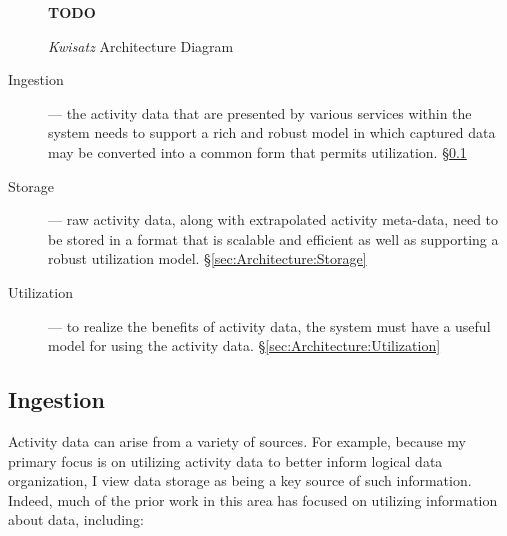 \documentclass[sigconf,anonymous,review]{acmart}
\newcommand{\system}[0]{\emph{Kwisatz}\xspace}
\begin{document}
\begin{figure}
    \caption{\system Architecture Diagram}\label{fig:architecture}
    \textbf{TODO}
\end{figure}

\begin{description}
    \item[Ingestion] --- the activity data that are presented by various
        services within the system needs to support a rich and robust model in which
        captured data may be converted into a common form that permits
        utilization. \S \ref{sec:Architecture:Ingestion}
    \item[Storage] --- raw activity data, along with extrapolated activity
        meta-data, need to be stored in a format that is scalable and efficient as
        well as supporting a robust utilization model. \S \ref{sec:Architecture:Storage}
    \item[Utilization] --- to realize the benefits of activity data, the system
        must have a useful model for using the activity data. \S \ref{sec:Architecture:Utilization}

\end{description}

\subsection{Ingestion}\label{sec:Architecture:Ingestion}

Activity data can arise from a variety of sources.  For example, because my
primary focus is on utilizing activity data to better inform logical data
organization, I view data storage as being a key source of such information.
Indeed, much of the prior work in this area has focused on utilizing information
about data, including:
\end{document}
